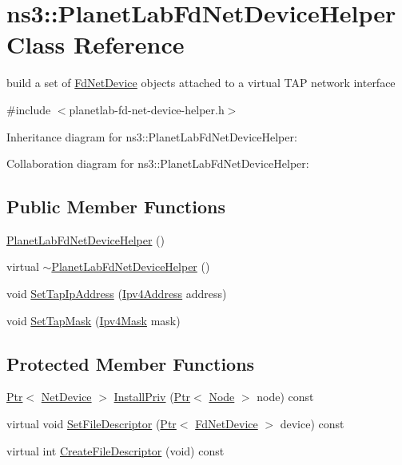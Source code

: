 \hypertarget{classns3_1_1PlanetLabFdNetDeviceHelper}{}\section{ns3\+:\+:Planet\+Lab\+Fd\+Net\+Device\+Helper Class Reference}
\label{classns3_1_1PlanetLabFdNetDeviceHelper}


build a set of \hyperlink{classns3_1_1FdNetDevice}{Fd\+Net\+Device} objects attached to a virtual T\+AP network interface  




{\ttfamily \#include $<$planetlab-\/fd-\/net-\/device-\/helper.\+h$>$}



Inheritance diagram for ns3\+:\+:Planet\+Lab\+Fd\+Net\+Device\+Helper\+:


Collaboration diagram for ns3\+:\+:Planet\+Lab\+Fd\+Net\+Device\+Helper\+:
\subsection*{Public Member Functions}
\begin{DoxyCompactItemize}
\item 
\hyperlink{classns3_1_1PlanetLabFdNetDeviceHelper_aaeb26b47008f773d2e70cb26c52ac836}{Planet\+Lab\+Fd\+Net\+Device\+Helper} ()
\item 
virtual \hyperlink{classns3_1_1PlanetLabFdNetDeviceHelper_ab047fe6de50064611dd7c119bb6ad91d}{$\sim$\+Planet\+Lab\+Fd\+Net\+Device\+Helper} ()
\item 
void \hyperlink{classns3_1_1PlanetLabFdNetDeviceHelper_ac66f980eff8589effa96dc55b8fa7e5d}{Set\+Tap\+Ip\+Address} (\hyperlink{classns3_1_1Ipv4Address}{Ipv4\+Address} address)
\item 
void \hyperlink{classns3_1_1PlanetLabFdNetDeviceHelper_a5092147c1cf87212697fd91a2c1294c9}{Set\+Tap\+Mask} (\hyperlink{classns3_1_1Ipv4Mask}{Ipv4\+Mask} mask)
\end{DoxyCompactItemize}
\subsection*{Protected Member Functions}
\begin{DoxyCompactItemize}
\item 
\hyperlink{classns3_1_1Ptr}{Ptr}$<$ \hyperlink{classns3_1_1NetDevice}{Net\+Device} $>$ \hyperlink{classns3_1_1PlanetLabFdNetDeviceHelper_a740ff8b94a42f4175af712baf00c83ab}{Install\+Priv} (\hyperlink{classns3_1_1Ptr}{Ptr}$<$ \hyperlink{classns3_1_1Node}{Node} $>$ node) const 
\item 
virtual void \hyperlink{classns3_1_1PlanetLabFdNetDeviceHelper_acec8004fe1776760866ab8f6ca1b2936}{Set\+File\+Descriptor} (\hyperlink{classns3_1_1Ptr}{Ptr}$<$ \hyperlink{classns3_1_1FdNetDevice}{Fd\+Net\+Device} $>$ device) const 
\item 
virtual int \hyperlink{classns3_1_1PlanetLabFdNetDeviceHelper_ab758ef1ac544c73625dbfd6fa9d48e4f}{Create\+File\+Descriptor} (void) const 
\end{DoxyCompactItemize}
